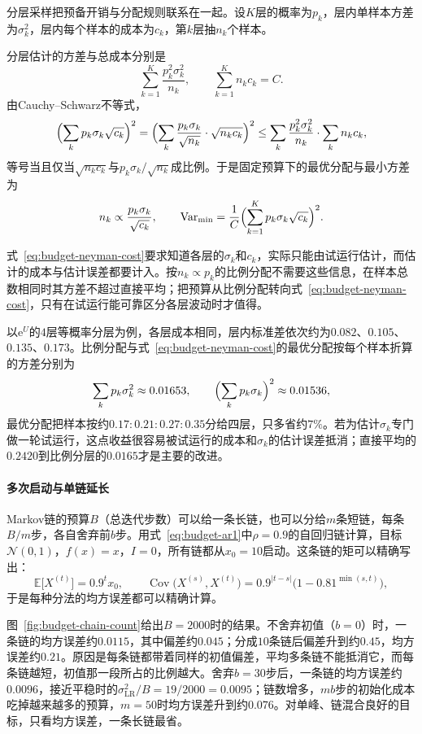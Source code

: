 分层采样把预备开销与分配规则联系在一起。设$K$层的概率为$p_k$，层内单样本方差为$\sigma_k^{2}$，层内每个样本的成本为$c_k$，第$k$层抽$n_k$个样本。

分层估计的方差与总成本分别是
\[
  \sum_{k=1}^{K}\frac{p_k^{2}\sigma_k^{2}}{n_k},\qquad\sum_{k=1}^{K}n_kc_k=C .
\]
由Cauchy--Schwarz不等式，
\[
  \Bigl(\sum_{k}p_k\sigma_k\sqrt{c_k}\Bigr)^{2}=\Bigl(\sum_{k}\frac{p_k\sigma_k}{\sqrt{n_k}}\cdot\sqrt{n_kc_k}\Bigr)^{2}\le\sum_{k}\frac{p_k^{2}\sigma_k^{2}}{n_k}\cdot\sum_{k}n_kc_k,
\]
等号当且仅当$\sqrt{n_kc_k}$与$p_k\sigma_k/\sqrt{n_k}$成比例。于是固定预算下的最优分配与最小方差为
\begin{equation}
  n_k\propto\frac{p_k\sigma_k}{\sqrt{c_k}},\qquad\operatorname{Var}_{\min}=\frac{1}{C}\Bigl(\sum_{k=1}^{K}p_k\sigma_k\sqrt{c_k}\Bigr)^{2} .
  \label{eq:budget-neyman-cost}
\end{equation}

式~\eqref{eq:budget-neyman-cost}要求知道各层的$\sigma_k$和$c_k$，实际只能由试运行估计，而估计的成本与估计误差都要计入。按$n_k\propto p_k$的比例分配不需要这些信息，在样本总数相同时其方差不超过直接平均；把预算从比例分配转向式~\eqref{eq:budget-neyman-cost}，只有在试运行能可靠区分各层波动时才值得。

以$\mathrm{e}^{U}$的$4$层等概率分层为例，各层成本相同，层内标准差依次约为$0.082$、$0.105$、$0.135$、$0.173$。比例分配与式~\eqref{eq:budget-neyman-cost}的最优分配按每个样本折算的方差分别为
\[
  \sum_{k}p_k\sigma_k^{2}\approx0.01653,\qquad\Bigl(\sum_{k}p_k\sigma_k\Bigr)^{2}\approx0.01536,
\]
最优分配把样本按约$0.17:0.21:0.27:0.35$分给四层，只多省约$7\%$。若为估计$\sigma_k$专门做一轮试运行，这点收益很容易被试运行的成本和$\sigma_k$的估计误差抵消；直接平均的$0.2420$到比例分层的$0.0165$才是主要的改进。

\paragraph{多次启动与单链延长}
Markov链的预算$B$（总迭代步数）可以给一条长链，也可以分给$m$条短链，每条$B/m$步，各自舍弃前$b$步。用式~\eqref{eq:budget-ar1}中$\rho=0.9$的自回归链计算，目标$\mathcal{N}(0,1)$，$f(x)=x$，$I=0$，所有链都从$x_{0}=10$启动。这条链的矩可以精确写出：
\[
  \mathbb{E}\bigl[X^{(t)}\bigr]=0.9^{t}x_{0},\qquad\operatorname{Cov}\bigl(X^{(s)},X^{(t)}\bigr)=0.9^{\lvert t-s\rvert}\bigl(1-0.81^{\min(s,t)}\bigr),
\]
于是每种分法的均方误差都可以精确计算。

图~\ref{fig:budget-chain-count}给出$B=2000$时的结果。不舍弃初值（$b=0$）时，一条链的均方误差约$0.0115$，其中偏差约$0.045$；分成$10$条链后偏差升到约$0.45$，均方误差约$0.21$。原因是每条链都带着同样的初值偏差，平均多条链不能抵消它，而每条链越短，初值那一段所占的比例越大。舍弃$b=30$步后，一条链的均方误差约$0.0096$，接近平稳时的$\sigma_{\mathrm{LR}}^{2}/B=19/2000=0.0095$；链数增多，$mb$步的初始化成本吃掉越来越多的预算，$m=50$时均方误差升到约$0.076$。对单峰、链混合良好的目标，只看均方误差，一条长链最省。


